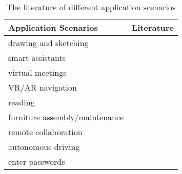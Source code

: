 \documentclass[review]{fcs}
\newcommand{\revise}[2]{\textcolor[rgb]{0,0,0}{#2}}
\begin{document}
\begin{table}[t]
    \centering
    \renewcommand\arraystretch{1.2}
    \caption{\revise{}{The literature of different application scenarios}}
    \begin{tabular}{m{2.5cm}<{\centering}|m{4cm}<{\centering}}
    \hline
        \cellcolor{oBlue!80} Application Scenarios & \cellcolor{oPink!80} Literature \\ \hline
        \cellcolor{oBlue!30} drawing and sketching & \cite{DBLP:conf/ismar/ChenGFCL23, DBLP:conf/chi/TurkmenGBSASPM24, DBLP:journals/tvcg/XuZSFY23, 10.1145/3613904.3642758, DBLP:journals/imwut/ChenLYZ22, DBLP:journals/tvcg/SongDK23}
        \\ \hline
        \cellcolor{oBlue!30} smart assistants & \cite{DBLP:conf/vr/GiunchiNGS24, DBLP:conf/chi/WangYWJ024, DBLP:conf/vr/YangQCSBLL24, DBLP:conf/chi/0005WBCRF24, 10.1145/3613904.3642068, DBLP:conf/chi/WuQQCRS24, DBLP:journals/imwut/WangSWYYWJXY24}
        \\ \hline
        \cellcolor{oBlue!30} virtual meetings & \cite{DBLP:conf/vr/SaintAubertAMPAL23, 10462901, DBLP:conf/uist/LiaoKJKS22, DBLP:conf/chi/CaoKWAX24, 10049667, DBLP:conf/vr/WangZF24}
        \\ \hline
        \cellcolor{oBlue!30} VR/AR navigation  & \cite{DBLP:conf/vr/QuereMJWW24, DBLP:conf/chi/WangYWJ024, DBLP:conf/vr/YangQCSBLL24}
        \\ \hline
        \cellcolor{oBlue!30} reading  & \cite{DBLP:conf/ismar/LeeHM22, DBLP:conf/ismar/MengXL22, DBLP:conf/ismar/XuMYSL22}
        \\ \hline
        \cellcolor{oBlue!30} furniture assembly/maintenance  & \cite{DBLP:conf/vr/YangQCSBLL24,DBLP:conf/vr/QuereMJWW24}
          \\ \hline
        \cellcolor{oBlue!30} remote collaboration  & \cite{DBLP:conf/vr/JingLB22, DBLP:journals/corr/abs-2405-18537}
         \\ \hline
        \cellcolor{oBlue!30} autonomous driving  & \cite{DBLP:conf/chi/ElsharkawyAYAHK24}
        \\ \hline
        \cellcolor{oBlue!30} enter passwords  & \cite{DBLP:conf/ismar/SongDK22, DBLP:conf/vr/RuppGBK24}
        \\ \hline
    \end{tabular}
    \label{scene}
\end{table}
\end{document}
